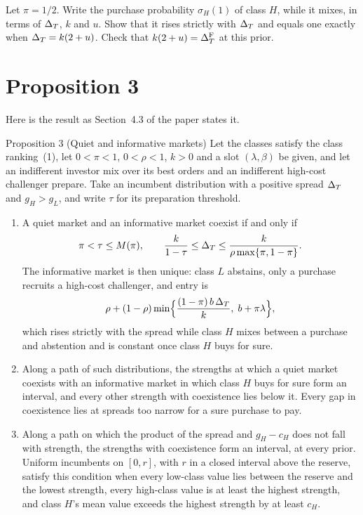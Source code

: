 \begin{checkyourself}\label{q:coexistence-mix}
Let \(\pi=1/2\). Write the purchase probability \(\sigma_H(1)\) of class \(H\), while it mixes, in terms of \(\Delta_T\),
\(k\) and \(u\). Show that it rises strictly with \(\Delta_T\) and equals one exactly when \(\Delta_T=k(2+u)\). Check that
\(k(2+u)=\Delta_T^{\rm F}\) at this prior.
\end{checkyourself}

\section{Proposition 3}\label{sec:coexistence-statement}

Here is the result as Section~4.3 of the paper states it.

\begin{paperresult}{Proposition 3 (Quiet and informative markets)}
Let the classes satisfy the class ranking~(1), let \(0<\pi<1\), \(0<\rho<1\), \(k>0\) and a slot \((\lambda,\beta)\)
be given, and let an indifferent investor mix over its best orders and an indifferent high-cost challenger prepare.
Take an incumbent distribution with a positive spread \(\Delta_T\) and \(g_H>g_L\), and write \(\tau\) for its preparation
threshold.
\begin{enumerate}[label=(\alph*),leftmargin=2em]
\item A quiet market and an informative market coexist if and only if
\[
\pi<\tau\le M(\pi),\qquad \frac{k}{1-\tau}\le\Delta_T\le\frac{k}{\rho\max\{\pi,1-\pi\}}.
\]
The informative market is then unique: class \(L\) abstains, only a purchase recruits a high-cost challenger, and
entry is
\[
\rho+(1-\rho)\min\Bigl\{\frac{(1-\pi)\,b\,\Delta_T}{k},\;b+\pi\lambda\Bigr\},
\]
which rises strictly with the spread while class \(H\) mixes between a purchase and abstention and is constant once
class \(H\) buys for sure.
\item Along a path of such distributions, the strengths at which a quiet market coexists with an informative market
in which class \(H\) buys for sure form an interval, and every other strength with coexistence lies below it. Every
gap in coexistence lies at spreads too narrow for a sure purchase to pay.
\item Along a path on which the product of the spread and \(g_H-c_H\) does not fall with strength, the strengths
with coexistence form an interval, at every prior. Uniform incumbents on \([0,r]\), with \(r\) in a closed interval
above the reserve, satisfy this condition when every low-class value lies between the reserve and the lowest
strength, every high-class value is at least the highest strength, and class \(H\)'s mean value exceeds the highest
strength by at least \(c_H\).
\end{enumerate}
\end{paperresult}

